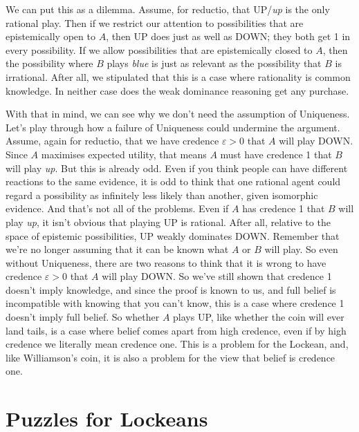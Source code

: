 \documentclass[11pt,]{book}
\begin{document}
We can put this as a dilemma. Assume, for reductio, that UP/\emph{up} is the only rational play. Then if we restrict our attention to possibilities that are epistemically open to \(A\), then UP does just as well as DOWN; they both get 1 in every possibility. If we allow possibilities that are epistemically closed to \(A\), then the possibility where \(B\) plays \emph{blue} is just as relevant as the possibility that \(B\) is irrational. After all, we stipulated that this is a case where rationality is common knowledge. In neither case does the weak dominance reasoning get any purchase.

With that in mind, we can see why we don't need the assumption of Uniqueness. Let's play through how a failure of Uniqueness could undermine the argument. Assume, again for reductio, that we have credence \(\varepsilon > 0\) that \(A\) will play DOWN. Since \(A\) maximises expected utility, that means \(A\) must have credence 1 that \(B\) will play \emph{up}. But this is already odd. Even if you think people can have different reactions to the same evidence, it is odd to think that one rational agent could regard a possibility as infinitely less likely than another, given isomorphic evidence. And that's not all of the problems. Even if \(A\) has credence 1 that \(B\) will play \emph{up}, it isn't obvious that playing UP is rational. After all, relative to the space of epistemic possibilities, UP weakly dominates DOWN. Remember that we're no longer assuming that it can be known what \(A\) or \(B\) will play. So even without Uniqueness, there are two reasons to think that it is wrong to have credence \(\varepsilon > 0\) that \(A\) will play DOWN. So we've still shown that credence 1 doesn't imply knowledge, and since the proof is known to us, and full belief is incompatible with knowing that you can't know, this is a case where credence 1 doesn't imply full belief. So whether \(A\) plays UP, like whether the coin will ever land tails, is a case where belief comes apart from high credence, even if by high credence we literally mean credence one. This is a problem for the Lockean, and, like Williamson's coin, it is also a problem for the view that belief is credence one.

\hypertarget{lockepuzzles}{%
\section{Puzzles for Lockeans}\label{lockepuzzles}}
\end{document}
